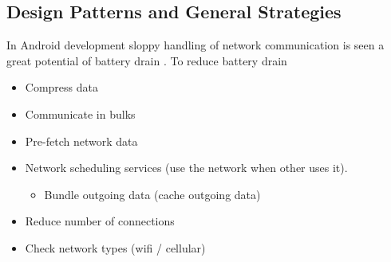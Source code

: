\subsection{Design Patterns and General Strategies}
\label{sub:design_patterns_and_general_strategies}

In Android development sloppy handling of network communication is seen a great potential of battery drain \parencite{android_network_scheduling}.
To reduce battery drain
\begin{itemize}
    \item Compress data
    \item Communicate in bulks
    \item Pre-fetch network data
    \item Network scheduling services (use the network when other uses it).
    \begin{itemize}
        \item Bundle outgoing data (cache outgoing data)
    \end{itemize}
    \item Reduce number of connections
    \item Check network types (wifi / cellular)
\end{itemize}

